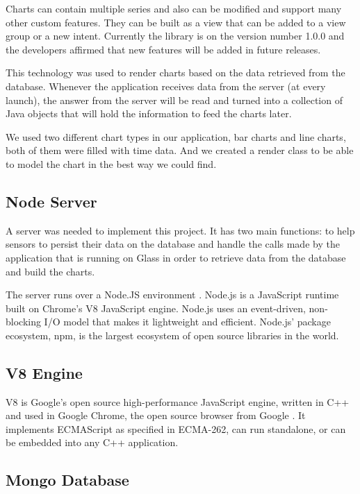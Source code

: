 \documentclass[a4paper,11pt]{article}
\begin{document}
Charts can contain multiple series and also can be modified and support many other custom features. They can be built as a view that can be added to a view group or a new intent.
Currently the library is on the version number 1.0.0 and the developers affirmed that new features will be added in future releases. 

This technology was used to render charts based on the data retrieved from the database. Whenever the application receives data from the server (at every launch), the answer from the server will be read and turned into a collection of Java objects that will hold the information to feed the charts later.

We used two different chart types in our application, bar charts and line charts, both of them were filled with time data. And we created a render class to be able to model the chart in the best way we could find.

\subsection{Node Server}

A server was needed to implement this project. It has two main functions: to help sensors to persist their data on the database and handle the calls made by the application that is running on Glass in order to retrieve data from the database and build the charts. 

The server runs over a Node.JS environment \cite{herokudev}. Node.js is a JavaScript runtime built on Chrome's V8 JavaScript engine. Node.js uses an event-driven, non-blocking I/O model that makes it lightweight and efficient. Node.js' package ecosystem, npm, is the largest ecosystem of open source libraries in the world.

\subsection{V8 Engine}

V8 is Google's open source high-performance JavaScript engine, written in C++ and used in Google Chrome, the open source browser from Google \cite{v8server}. It implements ECMAScript as specified in ECMA-262, can run standalone, or can be embedded into any C++ application.

\subsection{Mongo Database}
\end{document}

